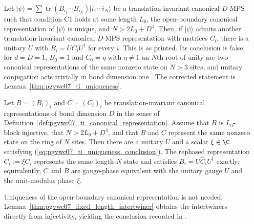 \begin{theorem}
    \label{thm:pgvwc07_ti_uniqueness_printed}
    \notready
    Let $\lvert\psi\rangle=\sum\operatorname{tr}(B_{i_1}\cdots B_{i_N})
        \lvert i_1\cdots i_N\rangle$ be a translation-invariant canonical
    $D$-MPS such that condition C1 holds at some length $L_0$, the
    open-boundary canonical representation of $\lvert\psi\rangle$ is unique,
    and $N>2L_0+D^4$. Then, if $\lvert\psi\rangle$ admits another
    translation-invariant canonical $D$-MPS representation with matrices
    $C_i$, there is a unitary $U$ with $B_i=UC_iU^\dagger$ for every $i$.
    This is \cite[Theorem~7]{PerezGarcia2007Matrix} as printed. Its
    conclusion is false: for $d=D=1$, $B_0=1$ and $C_0=\eta$ with $\eta\neq1$
    an $N$th root of unity are two canonical representations of the same
    nonzero state on $N>3$ sites, and unitary conjugation acts trivially in
    bond dimension one \cite{gap:pgvwc07_quadratic_reconstruction_phase}.
    The corrected statement is Lemma~\ref{thm:pgvwc07_ti_uniqueness}.
\end{theorem}

\begin{lemma}
    \label{thm:pgvwc07_ti_uniqueness}
    \leanok
    Let $B=(B_i)_i$ and $C=(C_i)_i$ be translation-invariant canonical
    representations of bond dimension $D$ in the sense of
    Definition~\ref{def:pgvwc07_ti_canonical_representation}. Assume that
    $B$ is $L_0$-block injective, that $N>2L_0+D^4$, and that $B$ and $C$
    represent the same nonzero state on the ring of $N$ sites. Then there
    are a unitary $U$ and a scalar $\xi\in\C$ satisfying
    (\ref{eq:pgvwc07_ti_uniqueness_conclusion}). The rephased
    representation $\widehat C_i:=\xi C_i$ represents the same length-$N$
    state and satisfies $B_i=U\widehat C_iU^\dagger$ exactly; equivalently,
    $C$ and $B$ are gauge-phase equivalent with the unitary gauge $U$ and the
    unit-modulus phase $\xi$.

    Uniqueness of the open-boundary canonical representation is not needed;
    Lemma~\ref{thm:pgvwc07_fixed_length_intertwiner} obtains the intertwiners
    directly from injectivity, yielding the conclusion recorded in
    \cite{gap:pgvwc07_ti_uniqueness_scope}.
\end{lemma}

